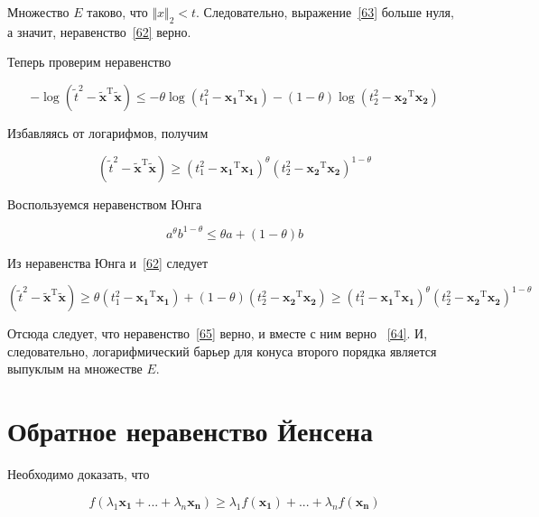 	Множество $E$ таково, что $\Vert x \Vert_2 < t$. Следовательно, выражение~\eqref{63} больше нуля, а значит, неравенство~\eqref{62} верно.
	
	Теперь проверим неравенство
	
	\begin{equation}
	\label{64}
	-\log(\tilde{t}^2 - \mathbf{\tilde{x}}^\text{T} \mathbf{\tilde{x}}) \leqslant - \theta \log(t_1^2 - \mathbf{x_1}^\text{T} \mathbf{x_1}) - (1-\theta) \log(t_2^2 - \mathbf{x_2}^\text{T} \mathbf{x_2})
	\end{equation}
	
	Избавляясь от логарифмов, получим
	
	\begin{equation}
	\label{65}
	(\tilde{t}^2 - \mathbf{\tilde{x}}^\text{T} \mathbf{\tilde{x}}) \geqslant (t_1^2 - \mathbf{x_1}^\text{T} \mathbf{x_1})^{\theta} (t_2^2 - \mathbf{x_2}^\text{T} \mathbf{x_2})^{1-\theta}
	\end{equation}
	
	Воспользуемся неравенством Юнга
	
	\begin{equation}
	a^\theta b^{1-\theta} \leqslant \theta a + (1-\theta) b
	\end{equation}
	
	Из неравенства Юнга и~\eqref{62} следует
	
	\begin{equation}
	(\tilde{t}^2 - \mathbf{\tilde{x}}^\text{T} \mathbf{\tilde{x}})\geqslant \theta (t_1^2 - \mathbf{x_1}^\text{T} \mathbf{x_1}) + (1-\theta)(t_2^2 - \mathbf{x_2}^\text{T} \mathbf{x_2}) \geqslant (t_1^2 - \mathbf{x_1}^\text{T} \mathbf{x_1})^{\theta} (t_2^2 - \mathbf{x_2}^\text{T} \mathbf{x_2})^{1-\theta}
	\end{equation}
	
	Отсюда следует, что неравенство~\eqref{65} верно, и вместе с ним верно ~\eqref{64}. И, следовательно, логарифмический барьер для конуса второго порядка является выпуклым на множестве $E$.
	
	\section{Обратное неравенство Йенсена}
	
	Необходимо доказать, что
	
	\begin{equation}
	f(\lambda_1 \mathbf{x_1} + ... + \lambda_n \mathbf{x_n} ) \geqslant \lambda_1 f(\mathbf{x_1}) + ... + \lambda_n f(\mathbf{x_n})
	\end{equation}
	
